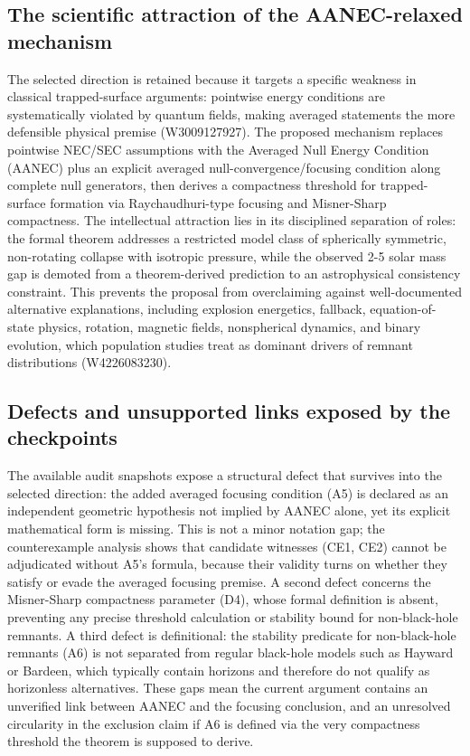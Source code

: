 \documentclass[conference]{IEEEtran}
\begin{document}
\subsection{The scientific attraction of the AANEC-relaxed mechanism}
The selected direction is retained because it targets a specific weakness in classical trapped-surface arguments: pointwise energy conditions are systematically violated by quantum fields, making averaged statements the more defensible physical premise (W3009127927). The proposed mechanism replaces pointwise NEC/SEC assumptions with the Averaged Null Energy Condition (AANEC) plus an explicit averaged null-convergence/focusing condition along complete null generators, then derives a compactness threshold for trapped-surface formation via Raychaudhuri-type focusing and Misner-Sharp compactness. The intellectual attraction lies in its disciplined separation of roles: the formal theorem addresses a restricted model class of spherically symmetric, non-rotating collapse with isotropic pressure, while the observed 2-5 solar mass gap is demoted from a theorem-derived prediction to an astrophysical consistency constraint. This prevents the proposal from overclaiming against well-documented alternative explanations, including explosion energetics, fallback, equation-of-state physics, rotation, magnetic fields, nonspherical dynamics, and binary evolution, which population studies treat as dominant drivers of remnant distributions (W4226083230).~\cite{cite_0ed84243cf171bc4,cite_fd0f77b2a173c0ab}

\subsection{Defects and unsupported links exposed by the checkpoints}
The available audit snapshots expose a structural defect that survives into the selected direction: the added averaged focusing condition (A5) is declared as an independent geometric hypothesis not implied by AANEC alone, yet its explicit mathematical form is missing. This is not a minor notation gap; the counterexample analysis shows that candidate witnesses (CE1, CE2) cannot be adjudicated without A5's formula, because their validity turns on whether they satisfy or evade the averaged focusing premise. A second defect concerns the Misner-Sharp compactness parameter (D4), whose formal definition is absent, preventing any precise threshold calculation or stability bound for non-black-hole remnants. A third defect is definitional: the stability predicate for non-black-hole remnants (A6) is not separated from regular black-hole models such as Hayward or Bardeen, which typically contain horizons and therefore do not qualify as horizonless alternatives. These gaps mean the current argument contains an unverified link between AANEC and the focusing conclusion, and an unresolved circularity in the exclusion claim if A6 is defined via the very compactness threshold the theorem is supposed to derive.
\end{document}
